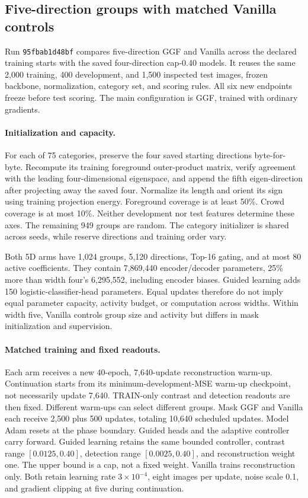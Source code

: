 \subsection{Five-direction groups with matched Vanilla controls}\label{app:width5}
Run \texttt{95fbab1d48bf} compares five-direction GGF and Vanilla across
the declared training starts with the saved four-direction cap-0.40 models. It reuses the
same 2,000 training, 400 development, and 1,500 inspected test
images, frozen backbone, normalization, category set, and scoring rules.
All six new endpoints freeze before test scoring. The main configuration is
GGF, trained with ordinary gradients.

\paragraph{Initialization and capacity.}
For each of 75 categories, preserve the four saved starting directions
byte-for-byte. Recompute its training foreground outer-product matrix,
verify agreement with the leading four-dimensional eigenspace, and append
the fifth eigen-direction after projecting away the saved four. Normalize
its length and orient its sign using training projection energy. Foreground
coverage is at least 50\%. Crowd coverage is at most 10\%. Neither development
nor test features determine these axes. The remaining 949 groups are random.
The category initializer is shared across seeds, while reserve directions
and training order vary.

Both 5D arms have 1,024 groups, 5,120 directions, Top-16 gating, and at most
80 active coefficients. They contain 7,869,440 encoder/decoder parameters,
25\% more than width four's 6,295,552, including encoder biases. Guided
learning adds 150 logistic-classifier-head parameters. Equal updates therefore do not
imply equal parameter capacity, activity budget, or computation across widths.
Within width five, Vanilla controls group size and activity but differs in
mask initialization and supervision.

\paragraph{Matched training and fixed readouts.}
Each arm receives a new 40-epoch, 7,640-update reconstruction warm-up.
Continuation starts from its minimum-development-MSE warm-up checkpoint,
not necessarily update 7,640. TRAIN-only contrast and detection readouts
are then fixed. Different warm-ups can select different groups. Mask GGF
and Vanilla each receive 2,500 plus 500 updates, totaling 10,640 scheduled
updates. Model Adam resets at the phase boundary. Guided heads and the
adaptive controller carry forward. Guided learning retains the same bounded
controller, contrast range $[0.0125,0.40]$, detection range $[0.0025,0.40]$,
and reconstruction weight one. The upper bound is a cap, not a fixed weight.
Vanilla trains reconstruction only. Both retain learning rate
$3\times10^{-4}$, eight images per update, noise scale 0.1, and gradient
clipping at five during continuation.

